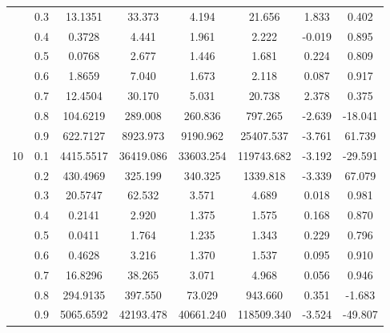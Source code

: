 \documentclass[11pt,a4paper]{report}
\begin{document}
\begin{longtable}{ | c | c || c | c | c | c | c | c | }
 & 0.3 & 13.1351 & 33.373 & 4.194 & 21.656 & 1.833 & 0.402 \\
 & 0.4 & 0.3728 & 4.441 & 1.961 & 2.222 & -0.019 & 0.895 \\
 & 0.5 & 0.0768 & 2.677 & 1.446 & 1.681 & 0.224 & 0.809 \\
 & 0.6 & 1.8659 & 7.040 & 1.673 & 2.118 & 0.087 & 0.917 \\
 & 0.7 & 12.4504 & 30.170 & 5.031 & 20.738 & 2.378 & 0.375 \\
 & 0.8 & 104.6219 & 289.008 & 260.836 & 797.265 & -2.639 & -18.041 \\
 & 0.9 & 622.7127 & 8923.973 & 9190.962 & 25407.537 & -3.761 & 61.739 \\
 \hline
\multirow{9}{*}{10} & 0.1 & 4415.5517 & 36419.086 & 33603.254 & 119743.682 & -3.192 & -29.591 \\
 & 0.2 & 430.4969 & 325.199 & 340.325 & 1339.818 & -3.339 & 67.079 \\
 & 0.3 & 20.5747 & 62.532 & 3.571 & 4.689 & 0.018 & 0.981 \\
 & 0.4 & 0.2141 & 2.920 & 1.375 & 1.575 & 0.168 & 0.870 \\
 & 0.5 & 0.0411 & 1.764 & 1.235 & 1.343 & 0.229 & 0.796 \\
 & 0.6 & 0.4628 & 3.216 & 1.370 & 1.537 & 0.095 & 0.910 \\
 & 0.7 & 16.8296 & 38.265 & 3.071 & 4.968 & 0.056 & 0.946 \\
 & 0.8 & 294.9135 & 397.550 & 73.029 & 943.660 & 0.351 & -1.683 \\
 & 0.9 & 5065.6592 & 42193.478 & 40661.240 & 118509.340 & -3.524 & -49.807 \\
 \hline
\hline
\end{longtable}
\end{document}
